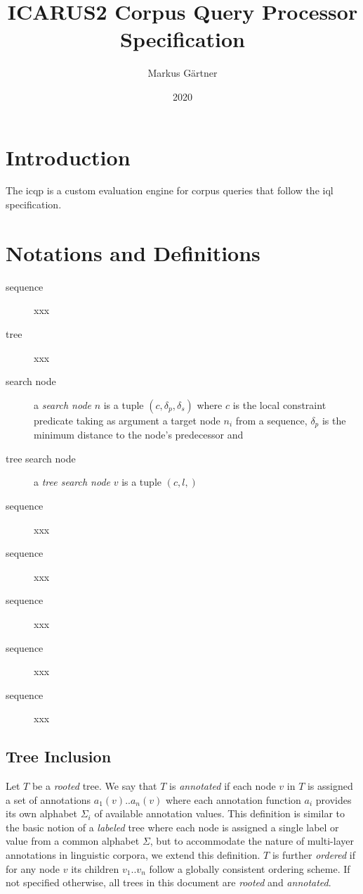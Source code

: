 \documentclass[11pt,a4paper]{report}
\title{ICARUS2 Corpus Query Processor Specification}
\author{Markus Gärtner}
\date{2020}
\begin{document}
\maketitle

\tableofcontents

\listoffigures

\listoftables

\listofalgorithms 

\newpage

\chapter*{Introduction}
\label{sec:intro}

The \ac{icqp} is a custom evaluation engine for corpus queries that follow the \ac{iql} specification.

\chapter{Notations and Definitions}
\label{chap:definitions}

\begin{description}
	\item[sequence] xxx
	\item[tree] xxx
	\item[search node] a \textit{search node} $n$ is a tuple $(c,\delta_p,\delta_s)$ where $c$ is the local constraint predicate taking as argument a target node $n_i$ from a sequence, $\delta_p$ is the minimum distance to the node's predecessor and  
	\item[tree search node] a \textit{tree search node} $v$ is a tuple $(c,l,)$
	\item[sequence] xxx
	\item[sequence] xxx
	\item[sequence] xxx
	\item[sequence] xxx
	\item[sequence] xxx
\end{description}


\section{Tree Inclusion}
\label{sec:tree-inclusion}

Let $T$ be a \textit{rooted} tree. 
We say that $T$ is \textit{annotated} if each node $v$ in $T$ is assigned a set of annotations $a_1(v)..a_n(v)$ where each annotation function $a_i$ provides its own alphabet $\Sigma_i$ of available annotation values.
This definition is similar to the basic notion of a \textit{labeled} tree where each node is assigned a single label or value from a common alphabet $\Sigma$, but to accommodate the nature of multi-layer annotations in linguistic corpora, we extend this definition.
$T$ is further \textit{ordered} if for any node $v$ its children $v_1..v_n$ follow a globally consistent ordering scheme.
If not specified otherwise, all trees in this document are \textit{rooted} and \textit{annotated}.
\end{document}
